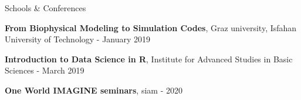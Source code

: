 \begin{rSection}{Schools \& Conferences}	
	\begin{rSubsection}{}{}{}{}
		\item \textbf{From Biophysical Modeling to Simulation Codes}, Graz university, Isfahan University of Technology - January 2019
		\item \textbf{Introduction to Data Science in R}, Institute for Advanced Studies in Basic Sciences - March 2019 %
		\item \textbf{One World IMAGINE seminars}, siam - 2020
	\end{rSubsection}
\end{rSection}